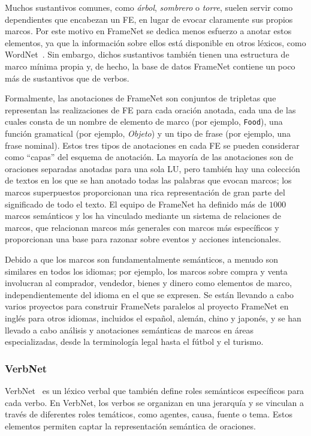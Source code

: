 Muchos sustantivos comunes, como \textit{árbol}, \textit{sombrero} o \textit{torre}, suelen servir como dependientes que encabezan un FE, en lugar de evocar claramente sus propios marcos.
Por este motivo en FrameNet se dedica menos esfuerzo a anotar estos elementos, ya que la información sobre ellos está disponible en otros léxicos, como WordNet~\cite{wordnet}.
Sin embargo, dichos sustantivos también tienen una estructura de marco mínima propia y, de hecho, la base de datos FrameNet contiene un poco más de sustantivos que de verbos.

Formalmente, las anotaciones de FrameNet son conjuntos de tripletas que representan las realizaciones de FE para cada oración anotada, cada una de las cuales consta de un nombre de elemento de marco (por ejemplo, \texttt{Food}), una función gramatical (por ejemplo, \textit{Objeto}) y un tipo de frase (por ejemplo, una frase nominal).
Estos tres tipos de anotaciones en cada FE se pueden considerar como ``capas'' del esquema de anotación.
La mayoría de las anotaciones son de oraciones separadas anotadas para una sola LU, pero también hay una colección de textos en los que se han anotado todas las palabras que evocan marcos; los marcos superpuestos proporcionan una rica representación de gran parte del significado de todo el texto.
El equipo de FrameNet ha definido más de $1000$ marcos semánticos y los ha vinculado mediante un sistema de relaciones de marcos, que relacionan marcos más generales con marcos más específicos y proporcionan una base para razonar sobre eventos y acciones intencionales.

Debido a que los marcos son fundamentalmente semánticos, a menudo son similares en todos los idiomas; por ejemplo, los marcos sobre compra y venta involucran al comprador, vendedor, bienes y dinero como elementos de marco, independientemente del idioma en el que se expresen.
Se están llevando a cabo varios proyectos para construir FrameNets paralelos al proyecto FrameNet en inglés para otros idiomas, incluidos el español, alemán, chino y japonés, y se han llevado a cabo análisis y anotaciones semánticas de marcos en áreas especializadas, desde la terminología legal hasta el fútbol y el turismo.

\subsubsection*{VerbNet}

VerbNet~\cite{verbnet} es un léxico verbal que también define roles semánticos específicos para cada verbo.
En VerbNet, los verbos se organizan en una jerarquía y se vinculan a través de diferentes roles temáticos, como agentes, causa, fuente o tema.
Estos elementos permiten captar la representación semántica de oraciones.

